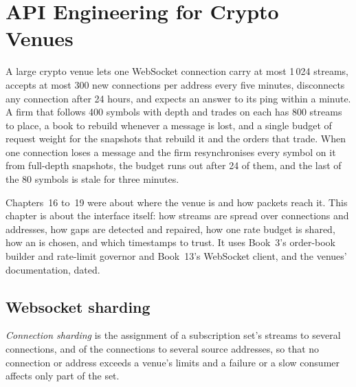 \chapter{API Engineering for Crypto Venues}\label{ch:nw:api-engineering-for-crypto-venues}

A large crypto venue lets one WebSocket connection carry at most 1\,024 streams, accepts at most 300 new connections per address every five
minutes, disconnects any connection after 24 hours, and expects an answer to its ping within a minute. A firm that follows 400 symbols with
depth and trades on each has 800 streams to place, a book to rebuild whenever a message is lost, and a single budget of request weight for
the snapshots that rebuild it and the orders that trade. When one connection loses a message and the firm resynchronises every symbol on it
from full-depth snapshots, the budget runs out after 24 of them, and the last of the 80 symbols is stale for three minutes.

Chapters~16 to~19 were about where the venue is and how packets reach it. This chapter is about the interface itself: how streams are spread
over connections and addresses, how gaps are detected and repaired, how one rate budget is shared, how an  is chosen, and
which timestamps to trust. It uses Book~3's order-book builder and rate-limit governor and Book~13's WebSocket client, and the venues'
documentation, dated.

\section{Websocket sharding}

\begin{definition}\label{def:nw:api-engineering-for-crypto-venues:shard}
\emph{Connection sharding} is the assignment of a subscription set's streams to several connections, and of the
connections to several source addresses, so that no connection or address exceeds a venue's limits and a failure or a slow consumer affects only
part of the set.
\end{definition}

